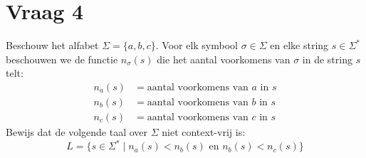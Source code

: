 \documentclass[kulak]{kulakarticle}
\theoremstyle{definition}
\begin{document}
	\section*{Vraag 4}

	Beschouw het alfabet \(\Sigma = \{a,b,c\}\). Voor elk symbool \(\sigma \in \Sigma\) en elke string \(s\in\Sigma^*\) beschouwen we de functie \(n_\sigma(s)\) die het aantal voorkomens van \(\sigma\) in de string \(s\) telt: \begin{align*}
		n_a(s) &= \text{aantal voorkomens van $a$ in $s$}\\
		n_b(s) &= \text{aantal voorkomens van $b$ in $s$}\\
		n_c(s) &= \text{aantal voorkomens van $c$ in $s$}
	\end{align*} Bewijs dat de volgende taal over \(\Sigma\) niet context-vrij is: \[L = \{s\in \Sigma^* \mid n_a(s) < n_b(s) \text{ en } n_b(s) < n_c(s)\}\]
\end{document}
